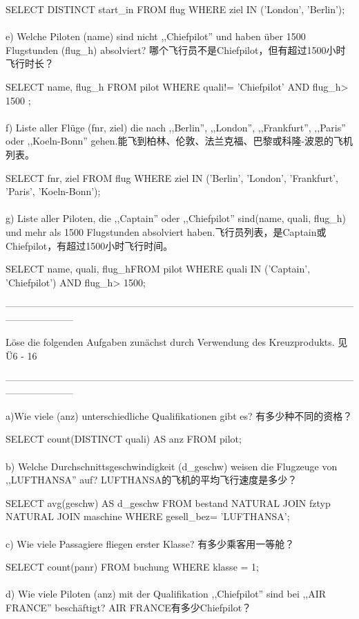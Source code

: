 \documentclass[fleqn]{article}
\begin{document}
SELECT DISTINCT start\_in FROM flug WHERE ziel IN ('London', 'Berlin');
\\
\\
\noindent e) Welche Piloten (name) sind nicht ,,Chiefpilot'' und haben über 1500 Flugstunden (flug\_h) absolviert? 哪个飞行员不是Chiefpilot，但有超过1500小时飞行时长？

SELECT name, flug\_h FROM pilot WHERE quali!= 'Chiefpilot' AND flug\_h> 1500 ;
\\
\\
\noindent f) Liste aller Flüge (fnr, ziel) die nach ,,Berlin'', ,,London'', ,,Frankfurt'', ,,Paris'' oder ,,Koeln-Bonn'' gehen.能飞到柏林、伦敦、法兰克福、巴黎或科隆-波恩的飞机列表。

SELECT fnr, ziel FROM flug WHERE ziel IN ('Berlin', 'London', 'Frankfurt', 'Paris', 'Koeln-Bonn');
\\
\\
\noindent g) Liste aller Piloten, die ,,Captain'' oder ,,Chiefpilot'' sind(name, quali, flug\_h) und mehr als 1500  Flugstunden absolviert haben.飞行员列表，是Captain或Chiefpilot，有超过1500小时飞行时间。

SELECT name, quali, flug\_hFROM pilot WHERE quali IN ('Captain', 'Chiefpilot') AND flug\_h> 1500;

\noindent---------------------------------------------------------------------------------------------------------------------------------

Löse die folgenden Aufgaben zunächst durch Verwendung des Kreuzprodukts.
见Ü6 - 16

\noindent---------------------------------------------------------------------------------------------------------------------------------

\noindent a)Wie viele (anz) unterschiedliche Qualifikationen gibt es? 有多少种不同的资格？

SELECT count(DISTINCT quali) AS anz FROM pilot;
\\
\\
b) Welche Durchschnittsgeschwindigkeit (d\_geschw) weisen die Flugzeuge von ,,LUFTHANSA'' auf? LUFTHANSA的飞机的平均飞行速度是多少？

SELECT avg(geschw) AS d\_geschw FROM bestand NATURAL JOIN fztyp NATURAL JOIN maschine WHERE gesell\_bez= 'LUFTHANSA';
\\
\\
c) Wie viele Passagiere fliegen erster Klasse? 有多少乘客用一等舱？

SELECT count(panr) FROM buchung WHERE klasse = 1;
\\
\\
d) Wie viele Piloten (anz) mit der Qualifikation ,,Chiefpilot'' sind bei ,,AIR FRANCE'' beschäftigt? AIR FRANCE有多少Chiefpilot？
\end{document}
